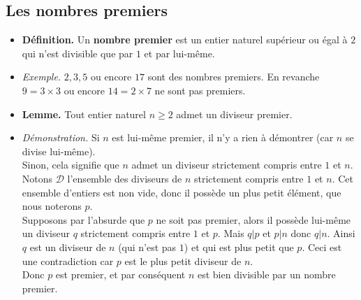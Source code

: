 \documentclass[11pt,class=report,crop=false]{standalone}
\begin{document}







\bigskip


\subsection*{Les nombres premiers}

\begin{itemize}
    \item \textbf{Définition.} Un \textbf{nombre premier} est un entier naturel supérieur ou égal à $2$ qui n'est divisible que par $1$ et par lui-même.
    
    \item \emph{Exemple.} $2,3,5$ ou encore $17$ sont des nombres premiers.
    En revanche $9=3\times3$ ou encore $14=2\times7$ ne sont pas premiers.
    
    \item \textbf{Lemme.} Tout entier naturel $n \geq 2$ admet un diviseur premier.
    
    \item \emph{Démonstration.}
    Si $n$ est lui-même premier, il n'y a rien à démontrer (car $n$ se divise lui-même).\\
    Sinon, cela signifie que $n$ admet un diviseur strictement compris entre $1$ et $n$. Notons $\mathcal{D}$ l'ensemble des diviseurs de $n$ strictement compris entre $1$ et $n$. Cet ensemble d'entiers est non vide, donc il possède un plus petit élément, que nous noterons $p$.\\
    Supposons par l'absurde que $p$ ne soit pas premier, alors il possède lui-même un diviseur $q$ strictement compris entre $1$ et $p$. Mais $q|p$ et $p|n$ donc $q|n$. Ainsi $q$ est un diviseur de $n$ (qui n'est pas $1$) et qui est plus petit que $p$. Ceci est une contradiction car $p$ est le plus petit diviseur de $n$.\\
    Donc $p$ est premier, et par conséquent $n$ est bien divisible par un nombre premier.
\end{itemize}
\end{document}

